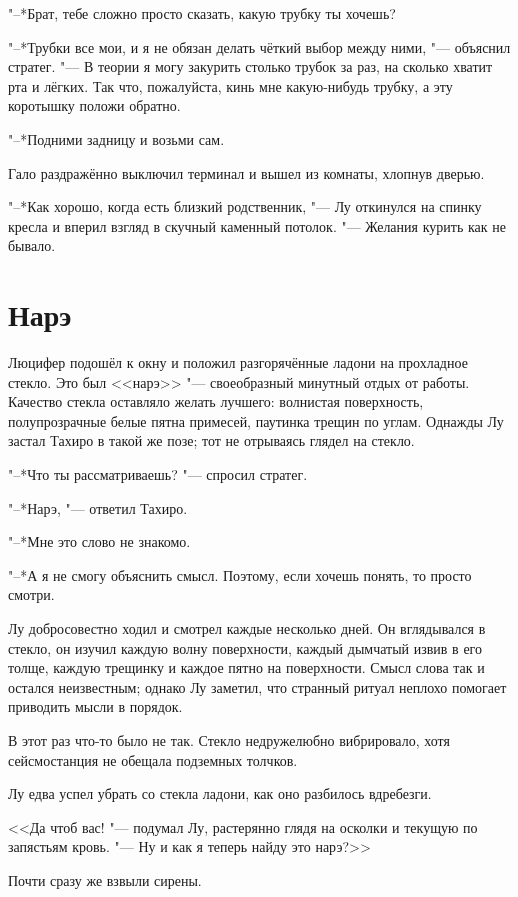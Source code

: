 \documentclass[a4paper,10pt,fleqn]{book}
\begin{document}
"--*Брат, тебе сложно просто сказать, какую трубку ты хочешь?

"--*Трубки все мои, и я не обязан делать чёткий выбор между ними, "--- объяснил стратег.
"--- В теории я могу закурить столько трубок за раз, на сколько хватит рта и лёгких.
Так что, пожалуйста, кинь мне какую-нибудь трубку, а эту коротышку положи обратно.

"--*Подними задницу и возьми сам.

Гало раздражённо выключил терминал и вышел из комнаты, хлопнув дверью.

"--*Как хорошо, когда есть близкий родственник, "--- Лу откинулся на спинку кресла и вперил взгляд в скучный каменный потолок.
"--- Желания курить как не бывало.

\section{Нарэ}

Люцифер подошёл к окну и положил разгорячённые ладони на прохладное стекло.
Это был <<нарэ>> "--- своеобразный минутный отдых от работы.
Качество стекла оставляло желать лучшего: волнистая поверхность, полупрозрачные белые пятна примесей, паутинка трещин по углам.
Однажды Лу застал Тахиро в такой же позе;
тот не отрываясь глядел на стекло.

"--*Что ты рассматриваешь? "--- спросил стратег.

"--*Нарэ, "--- ответил Тахиро.

"--*Мне это слово не знакомо.

"--*А я не смогу объяснить смысл.
Поэтому, если хочешь понять, то просто смотри.

Лу добросовестно ходил и смотрел каждые несколько дней.
Он вглядывался в стекло, он изучил каждую волну поверхности, каждый дымчатый извив в его толще, каждую трещинку и каждое пятно на поверхности.
Смысл слова так и остался неизвестным;
однако Лу заметил, что странный ритуал неплохо помогает приводить мысли в порядок.

В этот раз что-то было не так.
Стекло недружелюбно вибрировало, хотя сейсмостанция не обещала подземных толчков.

Лу едва успел убрать со стекла ладони, как оно разбилось вдребезги.

<<Да чтоб вас! "--- подумал Лу, растерянно глядя на осколки и текущую по запястьям кровь. "--- Ну и как я теперь найду это нарэ?>>

Почти сразу же взвыли сирены.
\end{document}
